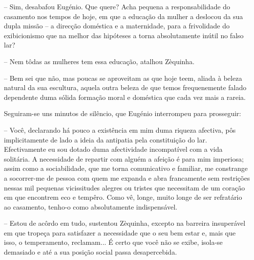 \documentclass[9pt]{article}
\begin{document}
-- Sim, desabafou Eugé\-nio. Que quere? Acha pequena a responsabilidade
do casamento nos tempos de hoje, em que a educa\-ção da mu\-lher a deslocou da
sua dupla missão -- a direc\-ção doméstica e a maternidade, para a frivolidade
do exibicionismo que na me\-lhor das hipóteses a torna absolutamente inútil
no falso lar?

-- Nem tôdas as mu\-lheres tem essa educa\-ção, ata\-lhou Zèquinha.

-- Bem sei que não, mas poucas se aproveitam as que hoje teem, alia\-da
à beleza natural da sua escultura, aquela outra beleza de que temos frequenemente falado dependente duma sólida forma\-ção moral e doméstica que cada
vez mais a rareia.

Seguiram-se uns minutos de silêncio, que Eugé\-nio interrompeu para prosseguir:

-- Você, declarando há pouco a exis\-tên\-cia em mim duma riqueza afectiva,
pôs implicitamente de lado a ideia da antipatia pela constitui\-ção do lar.
Efectivamente eu sou dotado duma afectividade incompatível com a vida solitária. A necessidade de repartir com alguém a afei\-ção é para mim imperiosa;
assim como a sociabilidade, que me torna comunicativo e familiar, me constrange a socorrer-me de pessoa com quem me expanda e abra francamente sem restri\-ções nessas mil pequenas vicissitudes alegres ou tristes que necessitam de
um cora\-ção em que encontrem eco e tempêro. Como vê, longe, muito longe de ser
refratário ao casamento, tenho-o como absolutamente indispensável.

-- Estou de acôrdo em tudo, sustentou Zèquinha, excepto na barreira insuperável em que tropeça para satisfazer a necessidade que o seu bem estar e,
mais que isso, o temperamento, reclamam... É certo que você não se exibe, isola-se demasiado e até a sua posi\-ção social passa desapercebida.
\end{document}
